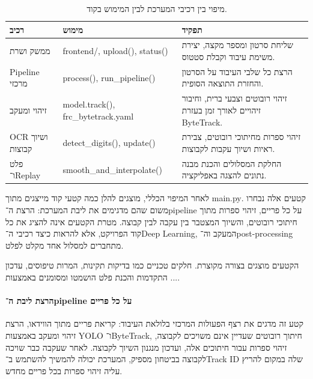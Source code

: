 \begin{table}[H]
\centering
\begin{tabular}{|p{}|p{}|p{}|}
\hline
\textbf{רכיב} & \textbf{מימוש} & \textbf{תפקיד} \\ \hline

ממשק ושרת &
\textenglish{frontend/}, \textenglish{upload()}, \textenglish{status()} &
שליחת סרטון ומספר מקצה, יצירת משימת עיבוד וקבלת סטטוס. \\ \hline

Pipeline מרכזי &
\textenglish{process()}, \textenglish{run\_pipeline()} &
הרצת כל שלבי העיבוד על הסרטון והחזרת התוצאה הסופית. \\ \hline

זיהוי ומעקב &
\textenglish{model.track()}, \textenglish{frc\_bytetrack.yaml} &
זיהוי רובוטים וצבעי ברית, וחיבור זיהויים לאורך זמן בעזרת \textenglish{ByteTrack}. \\ \hline

OCR ושיוך קבוצות &
\textenglish{detect\_digits()}, \textenglish{update()} &
זיהוי ספרות מחיתוכי רובוטים, צבירת ראיות ושיוך עקבות לקבוצות. \\ \hline

פלט ו־Replay &
\textenglish{smooth\_and\_interpolate()} &
החלקת המסלולים והכנת מבנה נתונים להצגה באפליקציה. \\ \hline

\end{tabular}
\caption{מיפוי בין רכיבי המערכת לבין המימוש בקוד.}
\end{table}

לאחר המיפוי הכללי, מוצגים להלן כמה קטעי קוד מייצגים מתוך
\textenglish{main.py}. קטעים אלה נבחרו משום שהם מדגימים את ליבת
המערכת: הרצת ה־\textenglish{pipeline} על כל פריים, זיהוי ספרות מתוך
חיתוכי רובוטים, והשיוך המצטבר בין עקבה לבין קבוצה. מטרת הקטעים אינה
להציג את כל קוד הפרויקט, אלא להראות כיצד רכיבי ה־\textenglish{Deep
  Learning}, המעקב וה־\textenglish{post-processing} מתחברים למסלול אחד
מקלט לפלט.

הקטעים מוצגים בצורה מקוצרת. חלקים טכניים כמו בדיקות תקינות, המרות
טיפוסים, עדכון התקדמות והכנת פלט הושמטו ומסומנים באמצעות
\textenglish{...}.

\paragraph{הרצת ליבת ה־pipeline על כל פריים}

קטע זה מדגים את רצף הפעולות המרכזי בלולאת העיבוד: קריאת פריים מתוך
הווידאו, הרצת זיהוי ומעקב באמצעות \textenglish{YOLO}
ו־\textenglish{ByteTrack}, חיתוך רובוטים שעדיין אינם משויכים לקבוצה,
זיהוי ספרות עבור חיתוכים אלה, ועדכון מנגנון השיוך לקבוצה. לאחר שעקבה
כבר שויכה לקבוצה בביטחון מספיק, המערכת יכולה להמשיך להשתמש
ב־\textenglish{Track ID} שלה במקום להריץ עליה זיהוי ספרות בכל פריים
מחדש.

